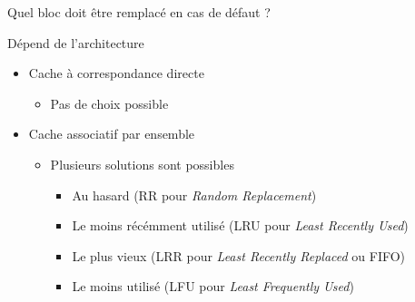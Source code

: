 %
\begin{Frame}{Quel bloc doit être remplacé en cas de défaut ?}

  \begin{block}{Dépend de l'architecture}
    \begin{itemize}
    \item Cache à correspondance directe
      
      \begin{itemize}
      \item Pas de choix possible
      \end{itemize}
      
	\item Cache associatif par ensemble 
      
      \begin{itemize}
      \item Plusieurs solutions sont possibles
        
        \begin{itemize}
        \item Au hasard (RR pour \emph{Random Replacement})	
        \item Le moins récémment utilisé (LRU pour \emph{Least Recently Used})
        \item Le plus vieux (LRR pour \emph{Least Recently Replaced} ou FIFO)
        \item Le moins utilisé (LFU pour \emph{Least Frequently Used})
        \end{itemize}
      \end{itemize}
    \end{itemize}
  \end{block} 
\end{Frame}


